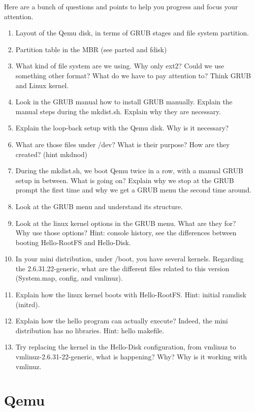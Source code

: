 \documentclass[10]{article}
\begin{document}
Here are a bunch of questions and points to help you progress
and focus your attention.

\begin{enumerate}
\item
Layout of the Qemu disk, in terms of GRUB stages and file system partition.
\item
Partition table in the MBR (see parted and fdisk)
\item 
What kind of file system are we using.
Why only ext2? Could we use something other format?
What do we have to pay attention to? Think GRUB
and Linux kernel.
\item
Look in the GRUB manual how to install GRUB manually.
Explain the manual steps during the mkdist.sh.
Explain why they are necessary. 
\item
Explain the loop-back setup with the Qemu disk.
Why is it necessary? 
\item 
What are those files under /dev?
What is their purpose? How are they created? (hint mkdnod)
\item 
During the mkdist.sh, we boot Qemu twice in a row, 
with a manual GRUB setup in between.
What is going on? 
Explain why we stop at the GRUB prompt the first time
and why we get a GRUB menu the second time around.
\item 
Look at the GRUB menu and understand its structure.
\item 
Look at the linux kernel options in the GRUB menu.
What are they for? Why use those options?
Hint: console history, see the differences between
booting Hello-RootFS and Hello-Disk.
\item
In your mini distribution, under /boot, you have
several kernels. Regarding the 2.6.31.22-generic,
what are the different files related to this version
(System.map, config, and vmlinuz).
\item
Explain how the linux kernel boots with Hello-RootFS.
Hint: initial ramdisk (initrd).
\item
Explain how the hello program can actually execute?
Indeed, the mini distribution has no libraries.
Hint: hello makefile.
\item 
Try replacing the kernel in the Hello-Disk configuration,
from vmlinuz to vmlinuz-2.6.31-22-generic, what is happening?
Why? Why is it working with vmlinuz.

\end{enumerate}



\section{Qemu}
\end{document}
